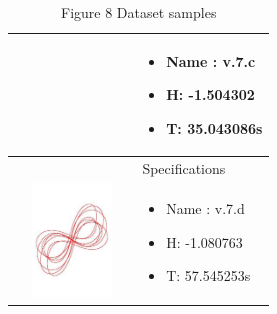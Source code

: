 \begin{table}[H]
\begin{tabular}{ | c | m{5cm}| }
\begin{minipage}{.3\textwidth}
		\end{minipage}
		&
		\begin{itemize}
			\item Name : v.7.c
			\item H: -1.504302
			\item T: 35.043086s
		\end{itemize}\\
		\hline
		& Specifications\\ 
		\begin{minipage}{.3\textwidth}
			\includegraphics[width=30mm, height=30mm]{chapters/chapter5/v7d.pdf}
		\end{minipage}
		&
		\begin{itemize}
			\item Name : v.7.d
			\item H: -1.080763
			\item T: 57.545253s
		\end{itemize}\\
		\hline
	\end{tabular}
	\caption{Figure 8 Dataset samples\cite{web}}\label{diverse}
	\label{fig8}
\end{table}


